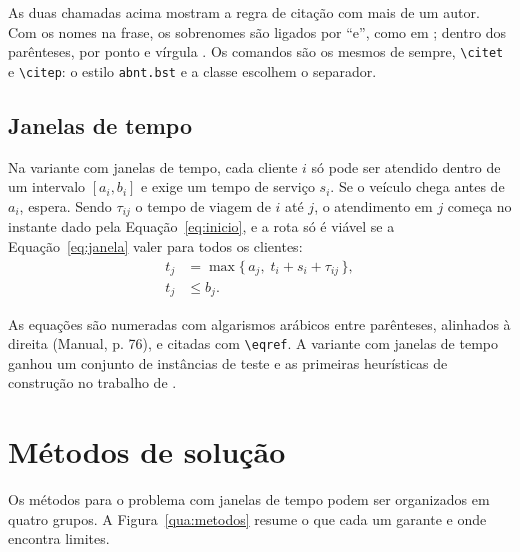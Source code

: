 \documentclass[tid]{texufpel}
\begin{document}
As duas chamadas acima mostram a regra de citação com mais de um autor. Com
os nomes na frase, os sobrenomes são ligados por ``e'', como em
\citet{Dantzig:1959:TDP}; dentro dos parênteses, por ponto e vírgula
\citep{Dantzig:1959:TDP}. Os comandos são os mesmos de sempre,
\verb|\citet| e \verb|\citep|: o estilo \texttt{abnt.bst} e a classe
escolhem o separador.

\section{Janelas de tempo}
\label{sec:janelas}

Na variante com janelas de tempo, cada cliente $i$ só pode ser atendido
dentro de um intervalo $[a_i, b_i]$ e exige um tempo de serviço $s_i$. Se o
veículo chega antes de $a_i$, espera. Sendo $\tau_{ij}$ o tempo de viagem de
$i$ até $j$, o atendimento em $j$ começa no instante dado pela
Equação~\eqref{eq:inicio}, e a rota só é viável se a
Equação~\eqref{eq:janela} valer para todos os clientes:
\begin{align}
  t_j &= \max \{\, a_j,\; t_i + s_i + \tau_{ij} \,\},
  \label{eq:inicio}\\
  t_j &\le b_j.
  \label{eq:janela}
\end{align}

As equações são numeradas com algarismos arábicos entre parênteses, alinhados
à direita (Manual, p. 76), e citadas com \verb|\eqref|. A variante com
janelas de tempo ganhou um conjunto de instâncias de teste e as primeiras
heurísticas de construção no trabalho de \citet{Solomon:1987:AVR}.

\chapter{Métodos de solução}
\label{cap:metodos}

Os métodos para o problema com janelas de tempo podem ser organizados em
quatro grupos. A Figura~\ref{qua:metodos} resume o que cada um garante e onde
encontra limites.
\end{document}
